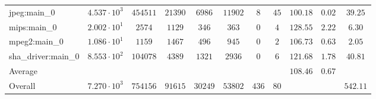\begin{tabular}{|l|c|c|c|c|c|c|c|c|c|c|}
jpeg:main\_0            & $ 4.537 \cdot 10^{3}  $ & $ 454511 $ & $ 21390 $ & $ 6986  $ & $ 11902 $ & $ 8   $ & $ 45 $ & $ 100.18      $ & $ 0.02    $ & $ 39.25   $ \\
mips:main\_0            & $ 2.002 \cdot 10^{1}  $ & $ 2574   $ & $ 1129  $ & $ 346   $ & $ 363   $ & $ 0   $ & $ 4  $ & $ 128.55      $ & $ 2.22    $ & $ 6.30    $ \\
mpeg2:main\_0           & $ 1.086 \cdot 10^{1}  $ & $ 1159   $ & $ 1467  $ & $ 496   $ & $ 945   $ & $ 0   $ & $ 2  $ & $ 106.73      $ & $ 0.63    $ & $ 2.05    $ \\
sha\_driver:main\_0     & $ 8.553 \cdot 10^{2}  $ & $ 104078 $ & $ 4389  $ & $ 1321  $ & $ 2936  $ & $ 0   $ & $ 6  $ & $ 121.68      $ & $ 1.78    $ & $ 40.81   $ \\
\hline
Average                 & $                     $ & $        $ & $       $ & $       $ & $       $ & $     $ & $    $ & $ 108.46      $ & $ 0.67    $ & $         $ \\
\hline
Overall                 & $ 7.270 \cdot 10^{3}  $ & $ 754156 $ & $ 91615 $ & $ 30249 $ & $ 53802 $ & $ 436 $ & $ 80 $ & $             $ & $         $ & $ 542.11  $ \\
\hline
\end{tabular}
